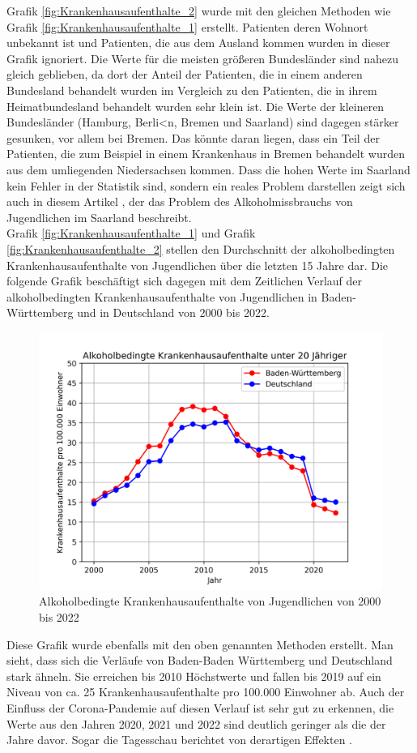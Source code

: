 \documentclass[12pt]{article}
\begin{document}
Grafik \ref{fig:Krankenhausaufenthalte_2} wurde mit den gleichen Methoden wie Grafik \ref{fig:Krankenhausaufenthalte_1} erstellt. Patienten deren Wohnort unbekannt ist und Patienten, die aus dem Ausland kommen wurden in dieser Grafik ignoriert. 
Die Werte für die meisten größeren Bundesländer sind nahezu gleich geblieben, da dort der Anteil der Patienten, die in einem anderen Bundesland behandelt wurden im Vergleich zu den Patienten, die in ihrem Heimatbundesland behandelt wurden sehr klein ist. Die Werte der kleineren Bundesländer (Hamburg, Berli<n, Bremen und Saarland) sind dagegen stärker gesunken, vor allem bei Bremen. Das könnte daran liegen, dass ein Teil der Patienten, die zum Beispiel in einem Krankenhaus in Bremen behandelt wurden aus dem umliegenden Niedersachsen kommen. Dass die hohen Werte im Saarland kein Fehler in der Statistik sind, sondern ein reales Problem darstellen zeigt sich auch in diesem Artikel \autocite{noauthor_saarland_nodate}, der das Problem des Alkoholmissbrauchs von Jugendlichen im Saarland beschreibt. 
\\
Grafik \ref{fig:Krankenhausaufenthalte_1} und Grafik \ref{fig:Krankenhausaufenthalte_2} stellen den Durchschnitt der alkoholbedingten Krankenhausaufenthalte von Jugendlichen über die letzten 15 Jahre dar. Die folgende Grafik beschäftigt sich dagegen mit dem Zeitlichen Verlauf der alkoholbedingten Krankenhausaufenthalte von Jugendlichen in Baden-Württemberg und in Deutschland von 2000 bis 2022.
\begin{figure}[H]
    \centering
    \includegraphics[scale=.7]{"assets/Alkohol_BW_Ges.png"}
    \caption{Alkoholbedingte Krankenhausaufenthalte von Jugendlichen von 2000 bis 2022}
    \label{fig:Krankenhausaufenthalte_3}
\end{figure}
Diese Grafik wurde ebenfalls mit den oben genannten Methoden erstellt.
Man sieht, dass sich die Verläufe von Baden-Baden Württemberg und Deutschland stark ähneln. Sie erreichen bis 2010 Höchstwerte und fallen bis 2019 auf ein Niveau von ca. 25 Krankenhausaufenthalte pro 100.000 Einwohner ab. Auch der Einfluss der Corona-Pandemie auf diesen Verlauf ist sehr gut zu erkennen, die Werte aus den Jahren 2020, 2021 und 2022 sind deutlich geringer als die der Jahre davor. Sogar die Tagesschau berichtet von derartigen Effekten \autocite{tagesschaude_weniger_nodate}.
\end{document}
